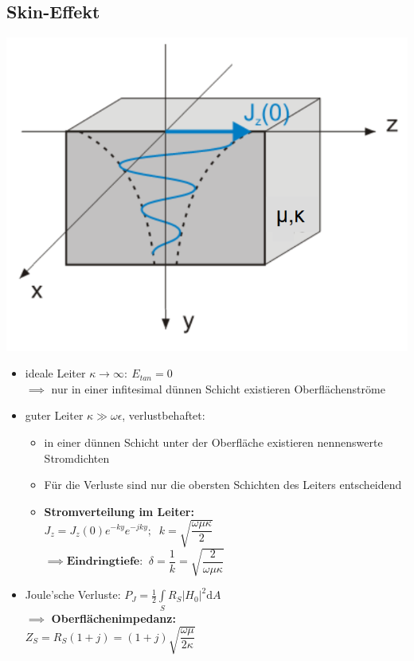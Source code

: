 	 \subsection{Skin-Effekt}%
	 \includegraphics[width=.3\paperheight]{content/fuw/pictures/skin_effect.png}
	 {\small%
	 \begin{itemize}
	 	\itemsep0pt
		\item ideale Leiter \(\kappa\to\infty:\: E_{tan} = 0\)\\
		\(\implies\) nur in einer infitesimal dünnen Schicht existieren Oberflächenströme
		\item guter Leiter \(\kappa\gg\omega\epsilon\), verlustbehaftet:
		\begin{itemize}
			\itemsep0pt
			\item in einer dünnen Schicht unter der Oberfläche existieren nennenswerte Stromdichten\\
			\item Für die Verluste sind nur die obersten Schichten des Leiters entscheidend
			\item \textbf{Stromverteilung im Leiter:}\\
			\(J_z = J_z(0)e^{-ky}e^{-jky};\;\;k=\sqrt{\dfrac{\omega\mu\kappa}{2}}\)\\
			\(\implies \mathrm{\textbf{Eindringtiefe:}}\;\; \delta = \dfrac{1}{k} = \sqrt{\dfrac{2}{\omega\mu\kappa}}\)
		\end{itemize}
		\item Joule'sche Verluste: \(P_J = \frac{1}{2}\int\limits_S R_S |H_0|^2\mathrm{d}A\)\\
		\(\implies\) \textbf{Oberflächenimpedanz:}\\
		\(Z_S = R_S (1 + j) = (1 + j)\sqrt{\dfrac{\omega\mu}{2\kappa}}\)
	 \end{itemize}
	 }

